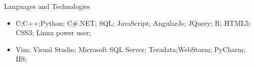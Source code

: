 \documentclass[]{nakulcv}
\begin{document}
	\begin{cvsection}{Languages and Technologies}
		\begin{cvsubsection}{}{}{}	
			\begin{itemize}
				\item C;C++;Python; C\#.NET; SQL; JavaScript; AngularJs; JQuery; R; HTML5; CSS3; Linux power user;
				\item Vim; Visual Studio; Microsoft SQL Server; Teradata;WebStorm; PyCharm; IIS;
			\end{itemize}
		\end{cvsubsection}
	\end{cvsection}
\end{document}
